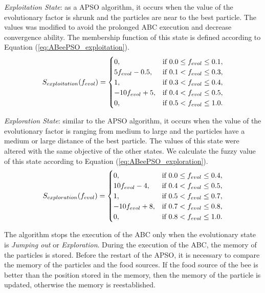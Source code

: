 \emph{Exploitation State}: as a APSO algorithm, it occurs when the value of the evolutionary factor is shrunk and the particles are near to the best particle. The values was modified to avoid the prolonged ABC execution and decrease convergence ability. The membership function of this state is defined according to Equation (\ref{eq:ABeePSO_exploitation}).
\begin{equation}
S_{exploitation}(f_{evol}) = \begin{cases}
0,                &\mbox{if $ 0.0 \leq f_{evol} \leq 0.1 $}, \\
5f_{evol} - 0.5,   &\mbox{if $ 0.1 <    f_{evol} \leq 0.3 $}, \\
1,                &\mbox{if $ 0.3 <    f_{evol} \leq 0.4 $}, \\
-10f_{evol} + 5,   &\mbox{if $ 0.4 <    f_{evol} \leq 0.5 $}, \\
0,                &\mbox{if $ 0.5 <    f_{evol} \leq 1.0 $}.
\end{cases}
\label{eq:ABeePSO_exploitation}
\end{equation}

\emph{Exploration State}: similar to the APSO algorithm, it occurs when the value of the evolutionary factor is ranging from medium to large and the particles have a medium or large distance of the best particle. The values of this state were altered with the same objective of the other states. We calculate the fuzzy value of this state according to Equation (\ref{eq:ABeePSO_exploration}).
\begin{equation}
S_{exploration}(f_{evol}) = \begin{cases}
0,                &\mbox{if $ 0.0 \leq f_{evol}  \leq 0.4 $}, \\
10f_{evol} - 4,    &\mbox{if $ 0.4   <  f_{evol}  \leq 0.5 $}, \\
1,                &\mbox{if $ 0.5   <  f_{evol}  \leq 0.7 $}, \\
-10f_{evol} + 8,  &\mbox{if $ 0.7   <  f_{evol}  \leq 0.8 $},  \\
0,                &\mbox{if $ 0.8   <  f_{evol}  \leq 1.0 $}.
\end{cases}
\label{eq:ABeePSO_exploration}
\end{equation}

The algorithm stops the execution of the ABC only when the evolutionary state is \emph{Jumping out} or \emph{Exploration}. During the execution of the ABC, the memory of the particles is stored. Before the restart of the APSO, it is necessary to compare the memory of the particles and the food sources. If the food source of the bee is better than the position stored in the memory, then the memory of the particle is updated, otherwise the memory is reestablished.

